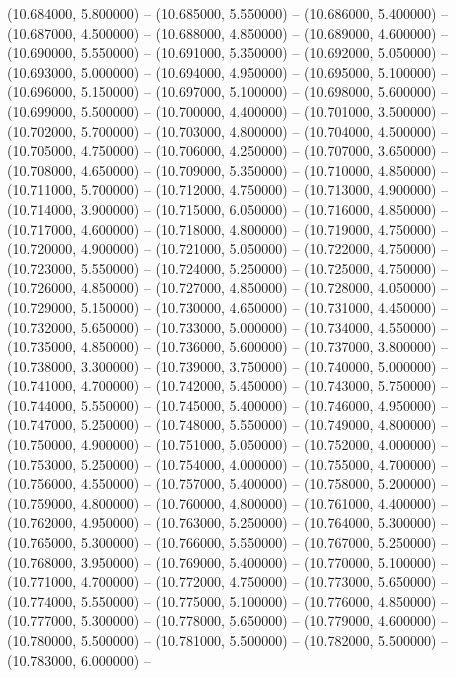 (10.684000, 5.800000) -- 
(10.685000, 5.550000) -- 
(10.686000, 5.400000) -- 
(10.687000, 4.500000) -- 
(10.688000, 4.850000) -- 
(10.689000, 4.600000) -- 
(10.690000, 5.550000) -- 
(10.691000, 5.350000) -- 
(10.692000, 5.050000) -- 
(10.693000, 5.000000) -- 
(10.694000, 4.950000) -- 
(10.695000, 5.100000) -- 
(10.696000, 5.150000) -- 
(10.697000, 5.100000) -- 
(10.698000, 5.600000) -- 
(10.699000, 5.500000) -- 
(10.700000, 4.400000) -- 
(10.701000, 3.500000) -- 
(10.702000, 5.700000) -- 
(10.703000, 4.800000) -- 
(10.704000, 4.500000) -- 
(10.705000, 4.750000) -- 
(10.706000, 4.250000) -- 
(10.707000, 3.650000) -- 
(10.708000, 4.650000) -- 
(10.709000, 5.350000) -- 
(10.710000, 4.850000) -- 
(10.711000, 5.700000) -- 
(10.712000, 4.750000) -- 
(10.713000, 4.900000) -- 
(10.714000, 3.900000) -- 
(10.715000, 6.050000) -- 
(10.716000, 4.850000) -- 
(10.717000, 4.600000) -- 
(10.718000, 4.800000) -- 
(10.719000, 4.750000) -- 
(10.720000, 4.900000) -- 
(10.721000, 5.050000) -- 
(10.722000, 4.750000) -- 
(10.723000, 5.550000) -- 
(10.724000, 5.250000) -- 
(10.725000, 4.750000) -- 
(10.726000, 4.850000) -- 
(10.727000, 4.850000) -- 
(10.728000, 4.050000) -- 
(10.729000, 5.150000) -- 
(10.730000, 4.650000) -- 
(10.731000, 4.450000) -- 
(10.732000, 5.650000) -- 
(10.733000, 5.000000) -- 
(10.734000, 4.550000) -- 
(10.735000, 4.850000) -- 
(10.736000, 5.600000) -- 
(10.737000, 3.800000) -- 
(10.738000, 3.300000) -- 
(10.739000, 3.750000) -- 
(10.740000, 5.000000) -- 
(10.741000, 4.700000) -- 
(10.742000, 5.450000) -- 
(10.743000, 5.750000) -- 
(10.744000, 5.550000) -- 
(10.745000, 5.400000) -- 
(10.746000, 4.950000) -- 
(10.747000, 5.250000) -- 
(10.748000, 5.550000) -- 
(10.749000, 4.800000) -- 
(10.750000, 4.900000) -- 
(10.751000, 5.050000) -- 
(10.752000, 4.000000) -- 
(10.753000, 5.250000) -- 
(10.754000, 4.000000) -- 
(10.755000, 4.700000) -- 
(10.756000, 4.550000) -- 
(10.757000, 5.400000) -- 
(10.758000, 5.200000) -- 
(10.759000, 4.800000) -- 
(10.760000, 4.800000) -- 
(10.761000, 4.400000) -- 
(10.762000, 4.950000) -- 
(10.763000, 5.250000) -- 
(10.764000, 5.300000) -- 
(10.765000, 5.300000) -- 
(10.766000, 5.550000) -- 
(10.767000, 5.250000) -- 
(10.768000, 3.950000) -- 
(10.769000, 5.400000) -- 
(10.770000, 5.100000) -- 
(10.771000, 4.700000) -- 
(10.772000, 4.750000) -- 
(10.773000, 5.650000) -- 
(10.774000, 5.550000) -- 
(10.775000, 5.100000) -- 
(10.776000, 4.850000) -- 
(10.777000, 5.300000) -- 
(10.778000, 5.650000) -- 
(10.779000, 4.600000) -- 
(10.780000, 5.500000) -- 
(10.781000, 5.500000) -- 
(10.782000, 5.500000) -- 
(10.783000, 6.000000) -- 
